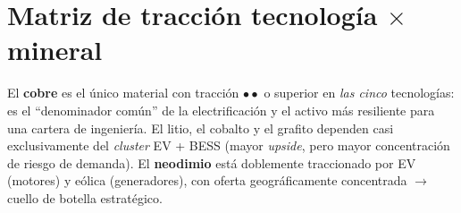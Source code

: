 \documentclass[11pt,letterpaper]{report}
\begin{document}
\section{Matriz de tracción tecnología $\times$ mineral}
\begin{table}[htbp]
\centering
\caption{Intensidad de la tracción tecnología $\times$ mineral. $\bullet\bullet\bullet=$ driver dominante; $\bullet\bullet=$ relevante; $\bullet=$ secundario; --- $=$ no material.}
\label{tab:traccion}
\scriptsize
\renewcommand{\arraystretch}{1.3}
\end{table}

\begin{cajahallazgo}
El \textbf{cobre} es el único material con tracción $\bullet\bullet$ o superior en \emph{las cinco} tecnologías: es el ``denominador
común'' de la electrificación y el activo más resiliente para una cartera de ingeniería. El litio, el cobalto y el grafito dependen
casi exclusivamente del \emph{cluster} EV + BESS (mayor \emph{upside}, pero mayor concentración de riesgo de demanda). El
\textbf{neodimio} está doblemente traccionado por EV (motores) y eólica (generadores), con oferta geográficamente concentrada
$\rightarrow$ cuello de botella estratégico.
\end{cajahallazgo}
\end{document}
